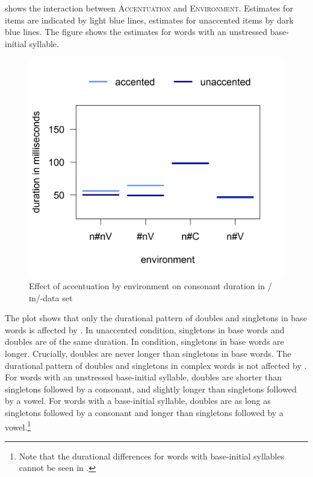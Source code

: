  shows the interaction between \textsc{Accentuation} and \textsc{Environment}. Estimates for  items are indicated by light blue lines, estimates for unaccented items by dark blue lines. The figure shows the estimates for words with an unstressed base-initial syllable. 


	\begin{figure}
		
		
		\includegraphics [scale=0.5] {images/Experiment/InModelCompleteInterEnvAcc} 
		\caption{Effect of accentuation by environment on consonant duration in /ɪn/-data set}
		\label{fig:Env Acc In complete experiment}
	\end{figure}


The plot shows that only the durational pattern of doubles and singletons in base words is affected by . 
In unaccented condition, singletons in base words and doubles are of the same duration. In  condition, singletons in base words are longer. Crucially, doubles are never longer than singletons in base words.
The durational pattern of doubles and singletons in complex words is not affected by . For words with an unstressed base-initial syllable, doubles are shorter than singletons followed by a consonant, and slightly longer than singletons followed by a vowel. For words with a  base-initial syllable, doubles are as long as singletons followed by a consonant and longer than singletons followed by a vowel.\footnote{Note that the durational differences for words with  base-initial syllables cannot be seen in .} 


